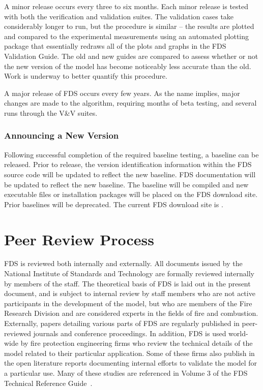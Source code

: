 \documentclass[11pt]{book}
\begin{document}
A minor release occurs every three to six months.
Each minor release is tested with both the verification and validation suites. The validation cases take considerably longer to run, but the
procedure is similar -- the results are plotted and compared to the experimental measurements using an automated plotting package that
essentially redraws all of the plots and graphs in the FDS Validation Guide. The old and new guides are compared to assess whether or not
the new version of the model has become noticeably less accurate than the old. Work is underway to better quantify this procedure.

A major release of FDS occurs every few years. As the name implies, major changes are made to the algorithm, requiring months of beta testing, and several
runs through the V\&V suites.


\subsection{Announcing a New Version}

Following successful completion of the required baseline testing, a baseline can be released.  Prior to release, the
version identification information within the FDS source code will be updated to reflect the new baseline.  FDS
documentation will be updated to reflect the new baseline.  The baseline will be compiled and new executable files
or installation packages will be placed on the FDS download site.  Prior baselines will be deprecated.  The
current FDS download site is \href{http://code.google.com/p/fds-smv/downloads/list}
{}.





\chapter{Peer Review Process}

FDS is reviewed both internally and externally. All documents issued by the National Institute of Standards and Technology are formally reviewed
internally by members of the staff. The theoretical basis of FDS is laid out in the present document, and is subject to internal review by staff
members who are not active participants in the development of the model, but who are members of the Fire Research Division and are considered experts
in the fields of fire and combustion. Externally, papers detailing various parts of FDS are regularly published in peer-reviewed journals and
conference proceedings. In addition, FDS is used world-wide by fire protection engineering firms who review the technical details of the model
related to their particular application. Some of these firms also publish in the open literature reports documenting internal efforts to validate the
model for a particular use. Many of these studies are referenced in Volume 3 of the FDS Technical Reference Guide~\cite{FDS_Tech_Guide}.
\end{document}

